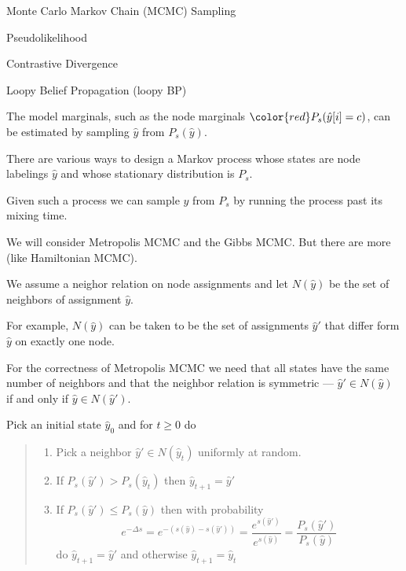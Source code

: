 {

Monte Carlo Markov Chain (MCMC) Sampling

\vfill
Pseudolikelihood

\vfill
Contrastive Divergence

\vfill
Loopy Belief Propagation (loopy BP)

The model marginals, such as the node marginals
 ${\color{red} P_s(\hat{y}[i]=c)}$, can be estimated by sampling $\hat{y}$ from $P_s(\hat{y})$.

\vfill
There are various ways to design a Markov process whose states are node labelings $\hat{y}$ and whose stationary distribution is $P_s$.

\vfill
Given such a process we can sample $\hat{y}$ from $P_s$ by running the process past its mixing time.

\vfill
We will consider Metropolis MCMC and the Gibbs MCMC.  But there are more (like Hamiltonian MCMC).


We assume a neighor relation on node assignments and let $N(\hat{y})$ be the set of neighbors of assignment $\hat{y}$.

\vfill
For example, $N(\hat{y})$ can be taken to be the set of assignments $\hat{y}'$ that differ form $\hat{y}$ on exactly one node.

\vfill
For the correctness of Metropolis MCMC we need that all states have the same number of neighbors and that the neighbor relation is symmetric ---
$\hat{y}' \in N(\hat{y})$ if and only if $\hat{y} \in N(\hat{y}')$.


Pick an initial state $\hat{y}_0$ and for $t \geq 0$ do
\vspace{-2ex}
\begin{quotation}

    \noindent \begin{enumerate}
    \item Pick a neighbor $\hat{y}' \in N(\hat{y}_t)$ uniformly at random.

    \vfill      
    \item If $P_s(\hat{y}') > P_s(\hat{y}_t)$ then {\color{red} $\hat{y}_{t+1} = \hat{y}'$}

    \vfill      
    \item If $P_s(\hat{y}') \leq P_s(\hat{y})$ then with probability
$$e^{-\Delta s} = e^{-(s(\hat{y}) - s(\hat{y}'))}   = \frac{e^{s(\hat{y}')}}{e^{s(\hat{y})}} = \frac{P_s(\hat{y}')}{P_s(\hat{y})}$$
   do  {\color{red} $\hat{y}_{t+1} = \hat{y}'$} and otherwise {\color{red} $\hat{y}_{t+1} = \hat{y}_t$} 
  \end{enumerate}  
\end{quotation}

}

